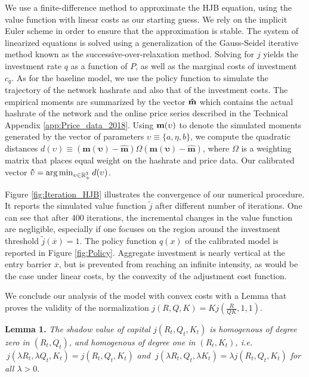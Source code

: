\documentclass[12pt, a4paper]{article}
\begin{document}
We use a finite-difference method to approximate the HJB equation, using
the value function with linear costs as our starting guess. We rely on the implicit Euler scheme in order to ensure that the
approximation is stable. The system of linearized equations is solved using
a generalization of the Gauss-Seidel iterative method known as the
successive-over-relaxation method. Solving for $j$ yields the investment rate
$q$ as a function of $P$, as well as the marginal costs of investment $c_q$.
As for the baseline model, we use the policy function to simulate the trajectory of the network hashrate
and also that of the investment costs.
The empirical moments are summarized by the vector $\mathbf{%
\hat{m}}$ which contains the actual hashrate of the network and the online price series described in
the Technical Appendix
\ref{app:Price_data_2018}. Using $\mathbf{m}(\mathbf{%
\upsilon )}$ to denote the simulated moments generated by the vector of
parameters $\upsilon \equiv \{a,\eta,b\}$, we compute the quadratic distances $d(\upsilon)\equiv
\left( \mathbf{m}(\mathbf{\upsilon})-\mathbf{\hat{m}}\right) \Omega \left(
\mathbf{m}(\mathbf{\upsilon} )-\mathbf{\hat{m}}\right)$, where $\Omega$ is a weighting
matrix that places equal weight on the hashrate and price data. Our calibrated vector
$\mathbf{\hat{\upsilon}}=\arg
\min_{\upsilon \in \mathbb{R}_{+}^{3}}d(\mathbf{%
\upsilon )}$.


Figure \ref{fig:Iteration_HJB} illustrates the convergence of our numerical procedure. It reports the simulated value function $\tilde{j}$
after different number of iterations. One can see that after 400 iterations, the incremental changes in the value function
are negligible, especially if one focuses on the region around the investment threshold $\tilde{j}(\overline{x})=1.$ The policy
function $q(x)$ of the calibrated model is reported in Figure \ref{fig:Policy}. Aggregate investment is nearly vertical
at the entry barrier $\overline{x}$, but is prevented from reaching an infinite intensity, as would be the case under linear costs,
by the convexity of the adjustment cost function.


We conclude our analysis of the model with convex costs with a Lemma that proves the validity of the normalization $j\left( R,Q,K\right)
=Kj\left( \frac{R}{QK},1,1\right)$.

\noindent \textbf{Lemma 1.}
\emph{The shadow value of capital $j\left(
R_{t},Q_{t},K_{t}\right) $ is homogenous of degree zero in $\left(
R_{t},Q_{t}\right) $, and homogenous of degree one in $\left(
R_{t},K_{t}\right) $, i.e. $\ j\left( \lambda R_{t},\lambda
Q_{t},K_{t}\right) =j\left( R_{t},Q_{t},K_{t}\right) $ and $\ j\left(
\lambda R_{t},Q_{t},\lambda K_{t}\right) =\lambda j\left(
R_{t},Q_{t},K_{t}\right) $ for all $\lambda >0.$
}
\end{document}
